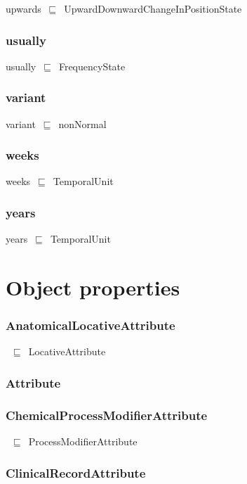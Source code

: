 \documentclass{article}
\begin{document}
upwards~\ensuremath{\sqsubseteq}~UpwardDownwardChangeInPositionState~

\subsubsection*{usually}

usually~\ensuremath{\sqsubseteq}~FrequencyState~

\subsubsection*{variant}

variant~\ensuremath{\sqsubseteq}~nonNormal~

\subsubsection*{weeks}

weeks~\ensuremath{\sqsubseteq}~TemporalUnit~

\subsubsection*{years}

years~\ensuremath{\sqsubseteq}~TemporalUnit~

\section*{Object properties}\subsubsection*{AnatomicalLocativeAttribute}

~\ensuremath{\sqsubseteq}~LocativeAttribute

\subsubsection*{Attribute}

\subsubsection*{ChemicalProcessModifierAttribute}

~\ensuremath{\sqsubseteq}~ProcessModifierAttribute

\subsubsection*{ClinicalRecordAttribute}
\end{document}
